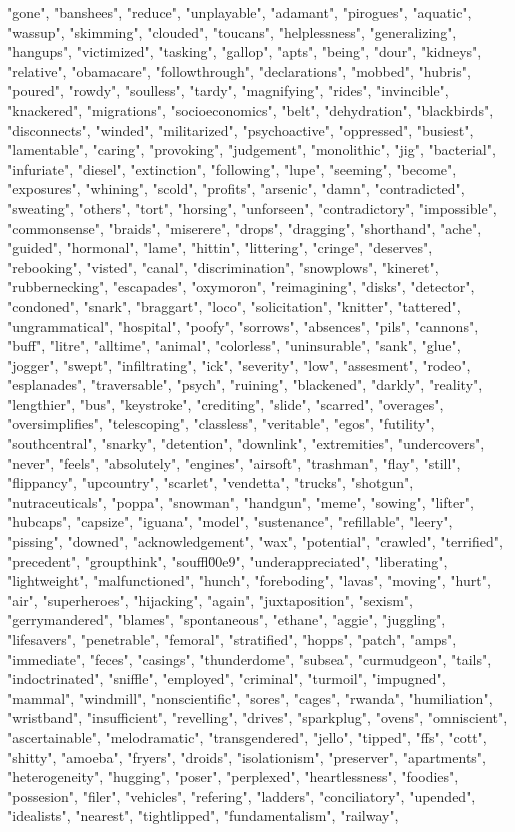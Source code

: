 "gone", "banshees", "reduce", "unplayable", "adamant", "pirogues", "aquatic", "wassup", "skimming", "clouded", "toucans", "helplessness", "generalizing", "hangups", "victimized", "tasking", "gallop", "apts", "being", "dour", "kidneys", "relative", "obamacare", "followthrough", "declarations", "mobbed", "hubris", "poured", "rowdy", "soulless", "tardy", "magnifying", "rides", "invincible", "knackered", "migrations", "socioeconomics", "belt", "dehydration", "blackbirds", "disconnects", "winded", "militarized", "psychoactive", "oppressed", "busiest", "lamentable", "caring", "provoking", "judgement", "monolithic", "jig", "bacterial", "infuriate", "diesel", "extinction", "following", "lupe", "seeming", "become", "exposures", "whining", "scold", "profits", "arsenic", "damn", "contradicted", "sweating", "others", "tort", "horsing", "unforseen", "contradictory", "impossible", "commonsense", "braids", "miserere", "drops", "dragging", "shorthand", "ache", "guided", "hormonal", "lame", "hittin", "littering", "cringe", "deserves", "rebooking", "visted", "canal", "discrimination", "snowplows", "kineret", "rubbernecking", "escapades", "oxymoron", "reimagining", "disks", "detector", "condoned", "snark", "braggart", "loco", "solicitation", "knitter", "tattered", "ungrammatical", "hospital", "poofy", "sorrows", "absences", "pils", "cannons", "buff", "litre", "alltime", "animal", "colorless", "uninsurable", "sank", "glue", "jogger", "swept", "infiltrating", "ick", "severity", "low", "assesment", "rodeo", "esplanades", "traversable", "psych", "ruining", "blackened", "darkly", "reality", "lengthier", "bus", "keystroke", "crediting", "slide", "scarred", "overages", "oversimplifies", "telescoping", "classless", "veritable", "egos", "futility", "southcentral", "snarky", "detention", "downlink", "extremities", "undercovers", "never", "feels", "absolutely", "engines", "airsoft", "trashman", "flay", "still", "flippancy", "upcountry", "scarlet", "vendetta", "trucks", "shotgun", "nutraceuticals", "poppa", "snowman", "handgun", "meme", "sowing", "lifter", "hubcaps", "capsize", "iguana", "model", "sustenance", "refillable", "leery", "pissing", "downed", "acknowledgement", "wax", "potential", "crawled", "terrified", "precedent", "groupthink", "souffl\u00e9", "underappreciated", "liberating", "lightweight", "malfunctioned", "hunch", "foreboding", "lavas", "moving", "hurt", "air", "superheroes", "hijacking", "again", "juxtaposition", "sexism", "gerrymandered", "blames", "spontaneous", "ethane", "aggie", "juggling", "lifesavers", "penetrable", "femoral", "stratified", "hopps", "patch", "amps", "immediate", "feces", "casings", "thunderdome", "subsea", "curmudgeon", "tails", "indoctrinated", "sniffle", "employed", "criminal", "turmoil", "impugned", "mammal", "windmill", "nonscientific", "sores", "cages", "rwanda", "humiliation", "wristband", "insufficient", "revelling", "drives", "sparkplug", "ovens", "omniscient", "ascertainable", "melodramatic", "transgendered", "jello", "tipped", "ffs", "cott", "shitty", "amoeba", "fryers", "droids", "isolationism", "preserver", "apartments", "heterogeneity", "hugging", "poser", "perplexed", "heartlessness", "foodies", "possesion", "filer", "vehicles", "refering", "ladders", "conciliatory", "upended", "idealists", "nearest", "tightlipped", "fundamentalism", "railway", 